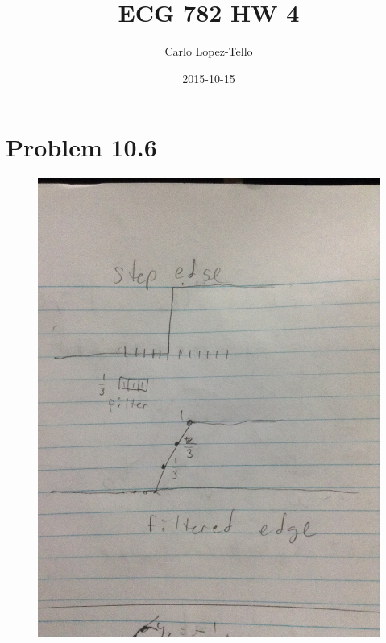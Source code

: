 \documentclass{article}
\title{ECG 782 HW 4}
\date{2015-10-15}
\author{Carlo Lopez-Tello}
\begin{document}
\maketitle
	\newpage
	\section{Problem 10.6}
	
	\begin{figure}[H]
		\includegraphics[width=\linewidth]{fig2.JPG}
	\end{figure}
	
	\newpage
\end{document}

